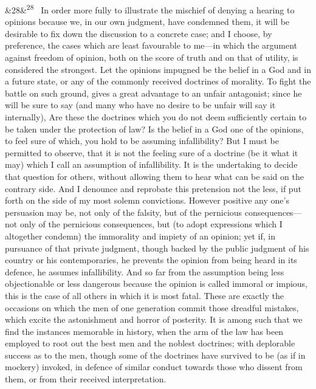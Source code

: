 \documentclass[12pt]{article}
\newcommand{\para}[1][]{\par\noindent\ifx&#1&\else\textsuperscript{\footnotesize #1}~\fi}
\begin{document}
\para[28] In order more fully to illustrate the mischief of denying a hearing to opinions because we, in our own judgment, have condemned them, it will be desirable to fix down the discussion to a concrete case; and I choose, by preference, the cases which are least favourable to me---in which the argument against freedom of opinion, both on the score of truth and on that of utility, is considered the strongest. Let the opinions impugned be the belief in a God and in a future state, or any of the commonly received doctrines of morality. To fight the battle on such ground, gives a great advantage to an unfair antagonist; since he will be sure to say (and many who have no desire to be unfair will say it internally), Are these the doctrines which you do not deem sufficiently certain to be taken under the protection of law? Is the belief in a God one of the opinions, to feel sure of which, you hold to be assuming infallibility? But I must be permitted to observe, that it is not the feeling sure of a doctrine (be it what it may) which I call an assumption of infallibility. It is the undertaking to decide that question for others, without allowing them to hear what can be said on the contrary side. And I denounce and reprobate this pretension not the less, if put forth on the side of my most solemn convictions. However positive any one's persuasion may be, not only of the falsity, but of the pernicious consequences---not only of the pernicious consequences, but (to adopt expressions which I altogether condemn) the immorality and impiety of an opinion; yet if, in pursuance of that private judgment, though backed by the public judgment of his country or his contemporaries, he prevents the opinion from being heard in its defence, he assumes infallibility. And so far from the assumption being less objectionable or less dangerous because the opinion is called immoral or impious, this is the case of all others in which it is most fatal. These are exactly the occasions on which the men of one generation commit those dreadful mistakes, which excite the astonishment and horror of posterity. It is among such that we find the instances memorable in history, when the arm of the law has been employed to root out the best men and the noblest doctrines; with deplorable success as to the men, though some of the doctrines have survived to be (as if in mockery) invoked, in defence of similar conduct towards those who dissent from them, or from their received interpretation.
\end{document}
